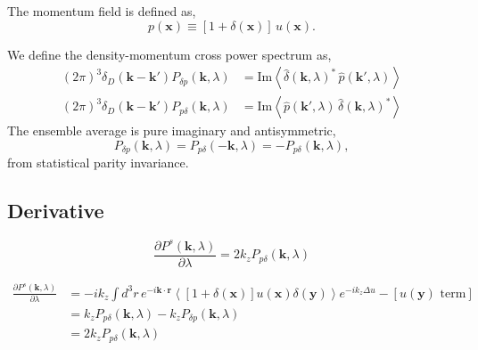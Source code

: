 \documentclass[a4paper,11pt, fleqn]{article}
\begin{document}
The momentum field is defined as,
%
\begin{equation}
  p(\bm{x}) \equiv [1 + \delta(\bm{x})] \, u(\bm{x}).
\end{equation}

We define the density-momentum cross power spectrum as,
\begin{align}
  (2\pi)^3 \delta_D(\bm{k} - \bm{k}') P_{\delta p}(\bm{k}, \lambda)
  &= \mathrm{Im} \left\langle
  \hat{\delta}(\bm{k}, \lambda)^* \, \hat{p}(\bm{k}', \lambda)
  \right\rangle\\
%
  (2\pi)^3 \delta_D(\bm{k} - \bm{k}') P_{p \delta}(\bm{k}, \lambda)
  &= \mathrm{Im} \left\langle
  \hat{p}(\bm{k}', \lambda) \, \hat{\delta}(\bm{k}, \lambda)^*
  \right\rangle
\end{align}
The ensemble average is pure imaginary and antisymmetric,
%
\begin{equation}
  P_{\delta p}(\bm{k}, \lambda) = P_{p \delta}(-\bm{k}, \lambda)
  = -P_{p \delta}(\bm{k}, \lambda),
\end{equation}
from statistical parity invariance.\\

\clearpage
\subsection{Derivative}

\begin{equation}
  \frac{\partial P^s(\bm{k}, \lambda)}{\partial \lambda}
  = 2 k_z P_{p \delta}(\bm{k}, \lambda)
\end{equation}
    
\begin{equation}\begin{split}
  \frac{\partial P^s(\bm{k}, \lambda)}{\partial \lambda}
  &= -ik_z \int \! d^3r \, e^{-i\bm{k}\cdot\bm{r}} \left\langle
  [1 + \delta(\bm{x})] u(\bm{x}) \delta(\bm{y}) \right\rangle e^{-ik_z \Delta u}
  - [u(\bm{y}) \mbox{ term}]\\
  &= k_z P_{p\delta}(\bm{k}, \lambda) - k_z P_{\delta p}(\bm{k}, \lambda)\\
  &= 2k_z P_{p\delta}(\bm{k}, \lambda)
\end{split}\end{equation}
\end{document}
